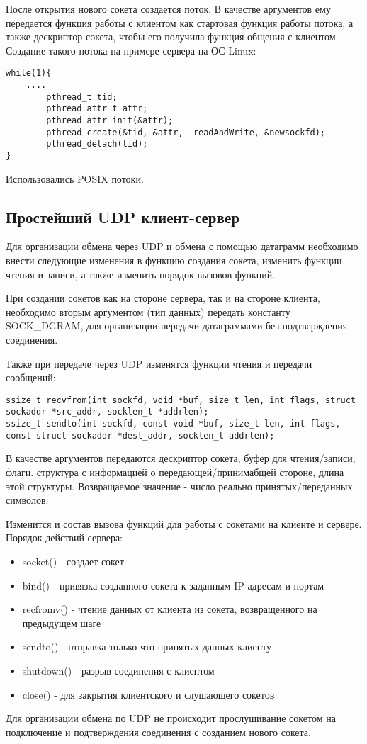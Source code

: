 После открытия нового сокета создается поток. В качестве аргументов ему передается функция работы с клиентом как стартовая функция работы потока, а также дескриптор сокета, чтобы его получила функция общения с клиентом. Создание такого потока на примере сервера на ОС Linux:
\begin{lstlisting}
while(1){
	....
        pthread_t tid;
        pthread_attr_t attr;
        pthread_attr_init(&attr);
        pthread_create(&tid, &attr,  readAndWrite, &newsockfd);
        pthread_detach(tid);
}
\end{lstlisting}
Использовались POSIX потоки.

\subsection{Простейший UDP клиент-сервер}
Для организации обмена через UDP и обмена с помощью датаграмм необходимо внести следующие изменения в функцию создания сокета, изменить функции чтения и записи, а также изменить порядок вызовов функций.

При создании сокетов как на стороне сервера, так и на стороне клиента, необходимо вторым аргументом (тип данных) передать константу SOCK\_DGRAM, для организации передачи датаграммами без подтверждения соединения.

Также при передаче через UDP изменятся функции чтения и передачи сообщений:
\begin{lstlisting}
ssize_t recvfrom(int sockfd, void *buf, size_t len, int flags, struct sockaddr *src_addr, socklen_t *addrlen);
ssize_t sendto(int sockfd, const void *buf, size_t len, int flags, const struct sockaddr *dest_addr, socklen_t addrlen);
\end{lstlisting}
В качестве аргументов передаются дескриптор сокета, буфер для чтения/записи, флаги. структура с информацией о передающей/принимабщей стороне, длина этой структуры.
Возвращаемое значение - число реально принятых/переданных символов.

Изменится и состав вызова функций для работы с сокетами на клиенте и сервере. 
Порядок действий сервера:
\begin{itemize}
\item socket() - создает сокет
\item bind() - привязка созданного сокета к заданным IP-адресам и портам
\item recfromv() - чтение данных от клиента из сокета, возвращенного на предыдущем шаге
\item sendto() - отправка только что принятых данных клиенту
\item shutdown() - разрыв соединения с клиентом
\item close() - для закрытия клиентского и слушающего сокетов
\end{itemize}
Для организации обмена по UDP не происходит прослушивание сокетом на подключение и подтверждения соединения с созданием нового сокета.

